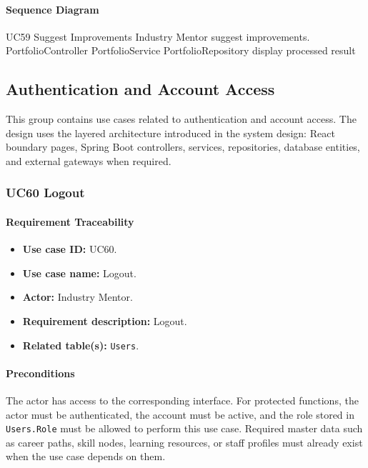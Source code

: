 \paragraph{Sequence Diagram}

\SequenceDiagram
{UC59 Suggest Improvements}
{Industry Mentor}
{suggest improvements.}
{PortfolioController}
{PortfolioService}
{PortfolioRepository}
{display processed result}

\subsection{Authentication and Account Access}

This group contains use cases related to authentication and account access. The design uses the layered architecture introduced in the system design: React boundary pages, Spring Boot controllers, services, repositories, database entities, and external gateways when required.

\subsubsection{UC60 Logout}

\paragraph{Requirement Traceability}

\begin{itemize}
    \item \textbf{Use case ID:} UC60.
    \item \textbf{Use case name:} Logout.
    \item \textbf{Actor:} Industry Mentor.
    \item \textbf{Requirement description:} Logout.
    \item \textbf{Related table(s):} \texttt{Users}.
\end{itemize}

\paragraph{Preconditions}

The actor has access to the corresponding interface. For protected functions, the actor must be authenticated, the account must be active, and the role stored in \texttt{Users.Role} must be allowed to perform this use case. Required master data such as career paths, skill nodes, learning resources, or staff profiles must already exist when the use case depends on them.

